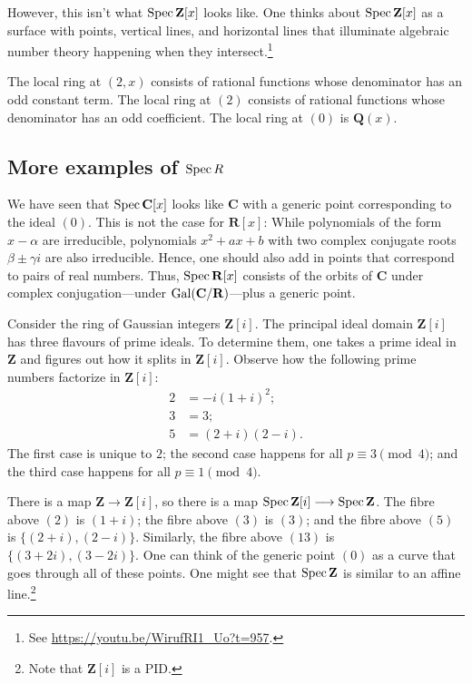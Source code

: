 \documentclass [11 pt, oneside, margin = 1 in] {article}
\begin{document}
However, this isn't what $\operatorname{Spec} \mathbf{Z}[x]$ looks like. One thinks about $\operatorname{Spec} \mathbf{Z}[x]$ as a surface with points, vertical lines, and horizontal lines that illuminate algebraic number theory happening when they intersect.\footnote{See \url{https://youtu.be/WirufRI1_Uo?t=957}.} 

The local ring at $(2,x)$ consists of rational functions whose denominator has an odd constant term. The local ring at $(2)$ consists of rational functions whose denominator has an odd coefficient. The local ring at $(0)$ is $\mathbf{Q}(x)$.

\subsection{More examples of $\operatorname{Spec} R$}
\begin{example}[ ]\label{}\text{}
We have seen that $\operatorname{Spec} \mathbf{C}[x]$ looks like $\mathbf{C}$ with a generic point corresponding to the ideal $(0)$. This is not the case for $\mathbf{R}[x]$: While polynomials of the form $x-\alpha$ are irreducible, polynomials $x^2 + ax + b$ with two complex conjugate roots $\beta\pm \gamma i$ are also irreducible. Hence, one should also add in points that correspond to pairs of real numbers. Thus, $\operatorname{Spec} \mathbf{R}[x]$ consists of the orbits of $\mathbf{C}$ under complex conjugation---under $\operatorname{Gal}(\mathbf{C}/\mathbf{R})$---plus a generic point.
\end{example}

\begin{example}[ ]\label{}\text{}
Consider the ring of Gaussian integers $\mathbf{Z}[i]$. The principal ideal domain $\mathbf{Z}[i]$ has three flavours of prime ideals. To determine them, one takes a prime ideal in $\mathbf{Z}$ and figures out how it splits in $\mathbf{Z}[i]$. Observe how the following prime numbers factorize in $\mathbf{Z}[i]$:
\begin{align*}
	2 &= -i (1+i)^2;\\ 
	3 &= 3;\\
	5 &= (2+i) (2-i).
\end{align*}
The first case is unique to $2$; the second case happens for all $p\equiv 3\pmod 4$; and the third case happens for all $p\equiv 1\pmod 4$.

There is a map $\mathbf{Z}\longrightarrow \mathbf{Z}[i]$, so there is a map $\operatorname{Spec} \mathbf{Z}[i]\longrightarrow \operatorname{Spec} \mathbf{Z}$. The fibre above $(2)$ is $(1+i)$; the fibre above $(3)$ is $(3)$; and the fibre above $(5)$ is $\{(2+i),  (2-i)\}$. Similarly, the fibre above $(13)$ is $\{(3+2i),  (3-2i)\}$. One can think of the generic point $(0)$ as a curve that goes through all of these points. One might see that $\operatorname{Spec} \mathbf{Z}$ is similar to an affine line.\footnote{Note that $\mathbf{Z}[i]$ is a PID.}
\end{example}
\end{document}
